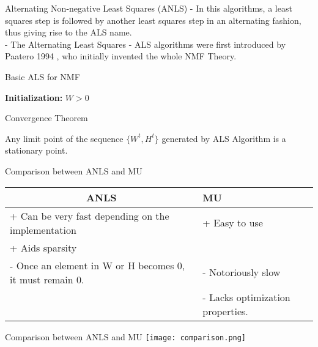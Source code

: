 \documentclass[aspectratio=169]{beamer}
\begin{document}
\begin{frame}{Alternating Non-negative Least Squares (ANLS)}
    - In this algorithms, a least squares step is followed by another least squares step in an alternating fashion, thus giving rise to the ALS name.\\
    - The Alternating Least Squares - ALS algorithms were first introduced by Paatero 1994 , 
    who initially invented the whole NMF Theory.
    \begin{algorithm}[H]
        \caption{Basic ALS for NMF}
        \textbf{Initialization:} $W > 0$\;
    \end{algorithm}
\end{frame}
\begin{frame}{Convergence Theorem}
    \begin{theorem}
        Any limit point of the sequence $\{W^{t} , H^{t}\}$ generated by ALS Algorithm  is a stationary point.
    \end{theorem}
    \end{frame}
    \begin{frame}{Comparison between ANLS and MU}
\begin{tabular}{|l|l|}
    \hline
    \multicolumn{1}{|c|}{ANLS} & MU \\
    \hline
    + Can be very fast depending on the implementation & + Easy to use  \\
    + Aids sparsity &  \\
    \hline
    -  Once an element in W or H becomes 0, it must remain 0. & - Notoriously slow \\
      & - Lacks optimization properties.\\
    \hline
\end{tabular}   
\end{frame}
\begin{frame}{Comparison between ANLS and MU}
    \texttt{[image: comparison.png]}\\
\end{frame}
\end{document}
